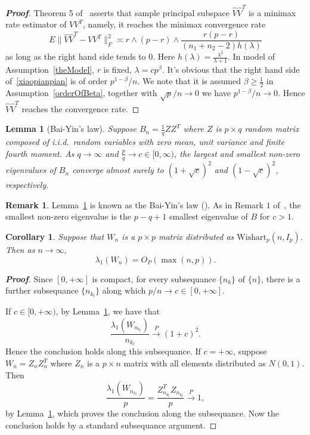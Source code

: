 \documentclass[review]{elsarticle}
\theoremstyle{plain}
\newtheorem{corollary}{\quad\quad Corollary}
\newtheorem{lemma}{\quad\quad Lemma}
\theoremstyle{definition}
\newtheorem{remark}{\quad\quad Remark}
\theoremstyle{remark}
\begin{document}
\begin{proof}[\textbf{Proof}]
    Theorem 5 of~\cite{Cai2012Sparse} asserts that sample principal subspace $\hat{V}\hat{V}^T$ is a minimax rate estimator of $VV^T$, namely, it reaches the minimax convergence rate
    \begin{equation}\label{xiaopianpian}
         E\|\hat{V}\hat{V}^T-VV^T\|^2_F\asymp r\wedge (p-r)\wedge \frac{r(p-r)}{(n_1+n_2-2)h(\lambda)}
    \end{equation}
    as long as the right hand side tends to $0$. Here $h(\lambda)=\frac{\lambda^2}{\lambda+1}$. In model of Assumption~\ref{theModel},  $r$ is fixed, $\lambda=cp^\beta$.
    It's obvious that the right hand side of~\eqref{xiaopianpian} is of order ${p^{1-\beta}}/{n}$.
    We note that it is assumed $\beta\geq \frac{1}{2}$ in Assumption~\ref{orderOfBeta}, together with ${\sqrt{p}}/{n}\to 0$ we have
    ${p^{1-\beta}}/{n}\to 0$. Hence
    $\hat{V}\hat{V}^T$ reaches the convergence rate.

\end{proof}
\begin{lemma}[Bai-Yin's law]\label{baiyin}
    Suppose $B_n=\frac{1}{q} Z Z^T$ where $Z$ is $p\times q$ random matrix composed of i.i.d.\ random variables with zero mean, unit variance and finite fourth moment.
    As $q\to \infty$ and $\frac{p}{q}\to c\in [0,\infty)$, the largest and smallest non-zero eigenvalues of $B_n$ converge almost surely to ${(1+\sqrt{c})}^2$ and $(1-\sqrt{c})^2$, respectively.
\end{lemma}
\begin{remark}
    Lemma~\ref{baiyin} is known as the Bai-Yin's law (\cite{bai1993limit}). As in Remark $1$ of~\cite{bai1993limit}, the smallest non-zero eigenvalue is the $p-q+1$ smallest eigenvalue of $B$ for $c>1$.
\end{remark}
\begin{corollary}\label{maxEigen}
    Suppose that $W_n$ is a $p \times p$ matrix distributed as $\mathrm{Wishart}_p(n,I_{p})$. Then as $n\to \infty$,
    $$
        \lambda_1(W_n)=O_P(\max(n,p)).
    $$
\end{corollary}
\begin{proof}[\textbf{Proof}]
    Since $[0,+\infty]$ is compact, for every subsequance $\{n_{k}\}$ of $\{n\}$, there is a further subsequance $\{n_{k_l}\}$ along which $p/n\to c\in [0,+\infty]$.

    If $c\in [0,+\infty)$, by Lemma~\ref{baiyin}, we have that
    $$
    \frac{\lambda_1(W_{n_{k_l}})}{n_{k_l}}\xrightarrow{P}{(1+c)}^2.
    $$
    Hence the conclusion holds along this subsequance. If $c=+\infty$, suppose $W_n=Z_n Z_n^T$ where $Z_n$ is a $p\times n$ matrix with all elements distributed as $N(0,1)$. Then
    $$
    \frac{\lambda_1(W_{n_{k_l}})}{p}=\frac{Z_{n_{k_l}}^T Z_{n_{k_l}}}{p}\xrightarrow{P} 1,
    $$
    by Lemma~\ref{baiyin}, which proves the conclusion along the subsequance. Now the conclusion holds by a standard subsequance argument.
\end{proof}
\end{document}
